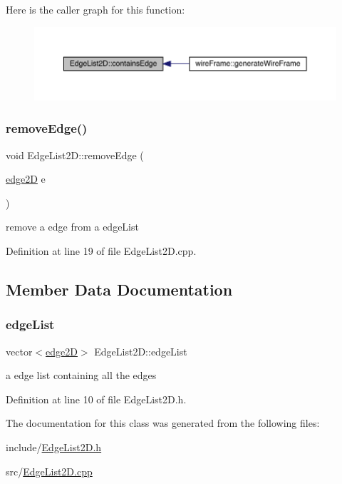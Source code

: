 Here is the caller graph for this function\+:
\nopagebreak
\begin{figure}[H]
\begin{center}
\leavevmode
\includegraphics[width=350pt]{class_edge_list2_d_a9d5ecf2dd50e5f75e189b9588ae784cc_icgraph}
\end{center}
\end{figure}
\mbox{\label{class_edge_list2_d_a33ad68f25aa0a9b35af5d983e4effd0b}} 
\subsubsection{\texorpdfstring{remove\+Edge()}{removeEdge()}}
{\footnotesize\ttfamily void Edge\+List2\+D\+::remove\+Edge (\begin{DoxyParamCaption}\item[{\mbox{\hyperlink{structedge2_d}{edge2D}}}]{e }\end{DoxyParamCaption})}



remove a edge from a edge\+List 



Definition at line 19 of file Edge\+List2\+D.\+cpp.



\subsection{Member Data Documentation}
\mbox{\label{class_edge_list2_d_a2e1dfffec9f77e762ecf1aef5b1f428b}} 
\subsubsection{\texorpdfstring{edge\+List}{edgeList}}
{\footnotesize\ttfamily vector$<$\mbox{\hyperlink{structedge2_d}{edge2D}}$>$ Edge\+List2\+D\+::edge\+List}



a edge list containing all the edges 



Definition at line 10 of file Edge\+List2\+D.\+h.



The documentation for this class was generated from the following files\+:\begin{DoxyCompactItemize}
\item 
include/\mbox{\hyperlink{_edge_list2_d_8h}{Edge\+List2\+D.\+h}}\item 
src/\mbox{\hyperlink{_edge_list2_d_8cpp}{Edge\+List2\+D.\+cpp}}\end{DoxyCompactItemize}
